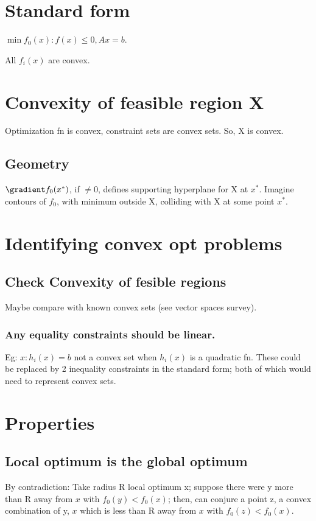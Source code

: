 \documentclass[oneside, article]{memoir}
\begin{document}
\section{Standard form}
$\min f_0(x): f(x) \leq 0, Ax = b$.

All $f_i(x)$ are convex.

\section{Convexity of feasible region X}
Optimization fn is convex, constraint sets are convex sets. So, X is convex.

\subsection{Geometry}
$\gradient f_0(x^{*})$, if $\neq 0$, defines supporting hyperplane for X at $x^{*}$. Imagine contours of $f_0$, with minimum outside X, colliding with X at some point $x^{*}$.

\section{Identifying convex opt problems}
\subsection{Check Convexity of fesible regions}
Maybe compare with known convex sets (see vector spaces survey).

\subsubsection{Any equality constraints should be linear.}
Eg: $x: h_i(x) = b$ not a convex set when $h_i(x)$ is a quadratic fn. These could be replaced by 2 inequality constraints in the standard form; both of which would need to represent convex sets.

\section{Properties}
\subsection{Local optimum is the global optimum}
By contradiction: Take radius R local optimum x; suppose there were y more than R away from $x$ with $f_0(y) < f_0(x)$; then, can conjure a point z, a convex combination of y, $x$ which is less than R away from $x$ with $f_0(z) < f_0(x)$.
\end{document}
